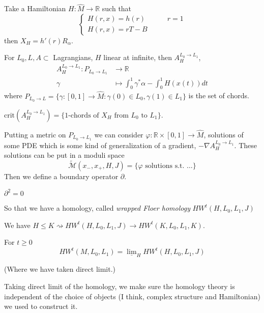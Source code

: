 \begin{remark}
\label{remark-Hamiltonian}
Take a Hamiltonian $H: \hat{M}\to \mathbb{R}$ such that
$$
\begin{cases}
H(r,x)=h(r)\qquad &r=1 \\
H(r,x)=rT-B\qquad &
\end{cases}
$$
then $X_H=h'(r)R_\alpha$.

For $L_0,L,A\subset$ Lagrangians, $H$ linear at infinite,
then $A_{H}^{L_0 \to L_1}$, 
\begin{align*}
A_{H}^{L_0 \to L_1}: P_{L_0\to L_1}  &\longrightarrow \mathbb{R} \\
\gamma &\longmapsto \int_0^1 \gamma^* \alpha- \int_0^1H(x(t))dt
\end{align*}
where $P_{L_0\to L} =\{\gamma:[0,1] \to \hat{M}:\gamma(0) \in L_0,
\gamma(1) \in L_1\}
$ is the set of chords.
\end{remark}

\begin{remark}
\label{remark-1-chords-are-crticial-points}
$\text{crit}(A_{H}^{L_0 \to L_1})=\{\text{1-chords of $X_H$ from 
 $L_0$ to $L_1$}\}$.
\end{remark}

Putting a metric on $P_{L_0 \to L_1}$ we can consider $\varphi:\mathbb{R} \times
[0,1] \to \hat{M}$, solutions of some PDE which is some kind
of generalization of a gradient, $- \nabla A_{H}^{L_0 \to L_1}$.
These solutions can be put in a moduli space
$$
\tilde{\mathcal{M}}(x_-,x_+,H,J)=\{\varphi\text{ solutions s.t. …}\}
$$
Then we define a boundary operator $\partial$.
\begin{theorem}
\label{theorem-homology}
$\partial^2=0$
\end{theorem}

So that we have a homology, called {\it wrapped Floer homology}
$HW^t(H,L_0,L_1,J)$

\begin{remark}
\label{remark-embedding}
We have $H \leq  K \rightsquigarrow HW^t(H,L_0,L_1,J) \to
HW^t(K,L_0,L_1,K)$.
\end{remark}

\begin{definition}
\label{definition-direct-limit}
For $t \geq 0$
$$
HW^t(M,L_0,L_1)=\underline{\lim }_H HW^t(H,L_0,L_1,J)
$$
\end{definition}

(Where we have taken direct limit.) 

Taking direct limit of the homology,
we make sure the homology theory is independent of the
choice of objects (I think, complex structure and Hamiltonian)
we used to construct it.



